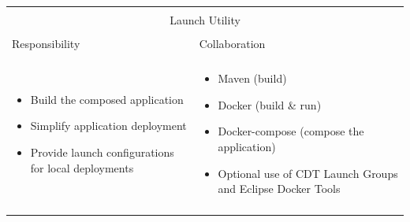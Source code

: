 \vspace{0.5cm} \noindent        
\begin{tabular}{|l|l|}
    \cline{1-2}
    \multicolumn{2}{|c|}{} \\[-0.3cm]
    \multicolumn{2}{|c|}{Launch Utility} \\ 
    \multicolumn{2}{|c|}{} \\[-0.3cm]
    \cline{1-2}
    Responsibility & Collaboration \\
    \cline{1-2}
    & \\[-0.2cm]
    \begin{minipage}{0.47\textwidth}
        \begin{itemize}
          	\item Build the composed application
			\item Simplify application deployment
          	\item Provide launch configurations for local deployments 
        \end{itemize} 
    \end{minipage}
	&
    \begin{minipage}{0.47\textwidth}
        \begin{itemize}
          \item Maven (build)
          \item Docker (build \& run)
          \item Docker-compose (compose the application)
          \item Optional use of CDT Launch Groups and Eclipse Docker Tools
        \end{itemize} 
    \end{minipage}
	\\ & \\
    \hline
\end{tabular}
